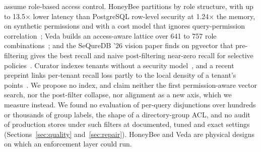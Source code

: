 assume role-based access control. HoneyBee partitions by role structure, with up to 13.5$\times$ lower
latency than PostgreSQL row-level security at 1.24$\times$ the memory, on synthetic permissions and
with a cost model that ignores query-permission correlation~\cite{zhong2026honeybee}; Veda builds an
access-aware lattice over 641 to 757 role combinations~\cite{han2026dont}; and the SeQureDB '26 vision
paper finds on pgvector that pre-filtering gives the best recall and naive post-filtering near-zero
recall for selective policies~\cite{yalamarthi2026policyaware}. Curator indexes tenants without a
security model~\cite{jin2024curator}, and a recent preprint links per-tenant recall loss partly to the
local density of a tenant's points~\cite{das2026recallbounded}. We propose no index, and claim neither the first permission-aware vector search, nor the post-filter collapse, nor
alignment as a new axis, which we measure instead. We found no evaluation of per-query disjunctions
over hundreds or thousands of group labels, the shape of a directory-group ACL, and no audit of
production stores under such filters at documented, tuned and exact settings
(Sections~\ref{sec:quality} and~\ref{sec:repair}). HoneyBee and Veda are physical designs on which an
enforcement layer could run.

